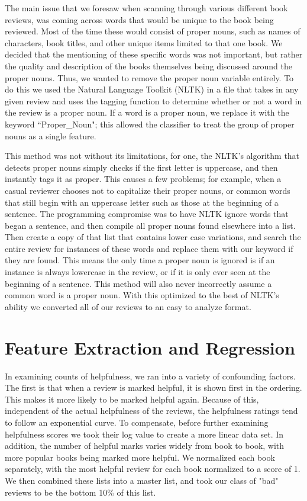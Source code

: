 \documentclass{article}
\begin{document}
\begin{multicols}{2}
The main issue that we foresaw when scanning through various different book reviews, was coming across words that would be unique to the book being reviewed. Most of the time these would consist of proper nouns, such as names of characters, book titles, and other unique items limited to that one book. We decided that the mentioning of these specific words was not important, but rather the quality and description of the books themselves being discussed around the proper nouns. Thus, we wanted to remove the proper noun variable entirely. To do this we used the Natural Language Toolkit (NLTK) in a file that takes in any given review and uses the tagging function to determine whether or not a word in the review is a proper noun. If a word is a proper noun, we replace it with the keyword “Proper\_Noun"; this allowed the classifier to treat the group of proper nouns as a single feature. 
 
This method was not without its limitations, for one, the NLTK’s algorithm that detects proper nouns simply checks if the first letter is uppercase, and then instantly tags it as proper. This causes a few problems; for example, when a casual reviewer chooses not to capitalize their proper nouns, or common words that still begin with an uppercase letter such as those at the beginning of a sentence. The programming compromise was to have NLTK ignore words that began a sentence, and then compile all proper nouns found elsewhere into a list. Then create a copy of that list that contains lower case variations, and search the entire review for instances of these words and replace them with our keyword if they are found. This means the only time a proper noun is ignored is if an instance is always lowercase in the review, or if it is only ever seen at the beginning of a sentence. This method will also never incorrectly assume a common word is a proper noun. With this optimized to the best of NLTK’s ability we converted all of our reviews to an easy to analyze format.

\section{Feature Extraction and Regression}

In examining counts of helpfulness, we ran into a variety of confounding factors. The first is that when a review is marked helpful, it is shown first in the ordering. This makes it more likely to be marked helpful again. Because of this, independent of the actual helpfulness of the reviews, the helpfulness ratings tend to follow an exponential curve. To compensate, before further examining helpfulness scores we took their log value to create a more linear data set. In addition, the number of helpful marks varies widely from book to book, with more popular books being marked more helpful. We normalized each book separately, with the most helpful review for each book normalized to a score of 1. We then combined these lists into a master list, and took our class of "bad" reviews to be the bottom 10\% of this list.


\end{multicols}
\end{document}
